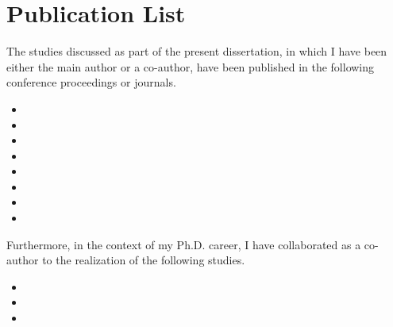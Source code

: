 \chapter{Publication List}
\label{chap:publications}

The studies discussed as part of the present dissertation, in which I have been either the main author or a co-author, have been published in the following conference proceedings or journals.

\preto{}

\begin{itemize}
\item {}
\item {}
\item {}
\item {}
\item {}
\item {}
\item {}
\item {}
\end{itemize}

Furthermore, in the context of my Ph.D. career, I have collaborated as a co-author to the realization of the following studies.

\begin{itemize}
\item {}
\item {}
\item {}
\end{itemize}
